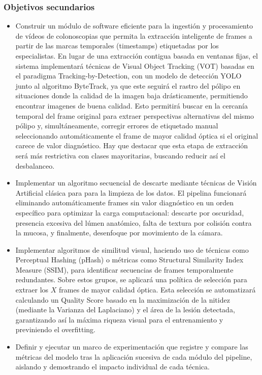 ﻿\documentclass[10pt,a4paper,twocolumn,twoside]{article}
\begin{document}
\subsubsection{Objetivos secundarios}
\begin{itemize}
    \item Construir un módulo de software eficiente para la ingestión y procesamiento de vídeos de colonoscopias que permita la extracción inteligente de frames a partir de las marcas temporales (timestamps) etiquetadas por los especialistas. En lugar de una extracción contigua basada en ventanas fijas, el sistema implementará técnicas de Visual Object Tracking (VOT) basadas en el paradigma Tracking-by-Detection, con un modelo de detección YOLO junto al algoritmo ByteTrack\cite{zhang2022bytetrack}, ya que este seguirá el rastro del pólipo en situaciones donde la calidad de la imagen baja drásticamente, permitiendo encontrar imagenes de buena calidad. Esto permitirá buscar en la cercanía temporal del frame original para extraer perspectivas alternativas del mismo pólipo y, simultáneamente, corregir errores de etiquetado manual seleccionando automáticamente el frame de mayor calidad óptica si el original carece de valor diagnóstico. Hay que destacar que esta etapa de extracción será más restrictiva con clases mayoritarias, buscando reducir así el desbalanceo.
    \item Implementar un algoritmo secuencial de descarte mediante técnicas de Visión Artificial clásica para para la limpieza de los datos. El pipelina funcionará eliminando automáticamente frames sin valor diagnóstico en un orden específico para optimizar la carga computacional: descarte por oscuridad, presencia excesiva del lúmen anatómico, falta de textura por colisión contra la mucosa, y finalmente, desenfoque por movimiento de la cámara.
    \item Implementar algoritmos de similitud visual, haciendo uso de técnicas como Perceptual Hashing (pHash) o métricas como Structural Similarity Index Measure (SSIM), para identificar secuencias de frames temporalmente redundantes. Sobre estos grupos, se aplicará una política de selección para extraer los $X$ frames de mayor calidad óptica. Esta selección se automatizará calculando un Quality Score basado en la maximización de la nitidez (mediante la Varianza del Laplaciano) y el área de la lesión detectada, garantizando así la máxima riqueza visual para el entrenamiento y previniendo el overfitting.
    \item Definir y ejecutar un marco de experimentación que registre y compare las métricas del modelo tras la aplicación sucesiva de cada módulo del pipeline, aislando y demostrando el impacto individual de cada técnica.
\end{itemize}
\end{document}
